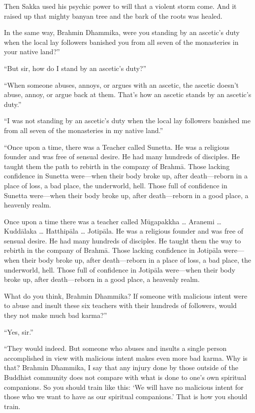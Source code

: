 \documentclass[12pt,openany]{book}%
\begin{document}
Then Sakka used his psychic power to will that a violent storm come. And it raised up that mighty banyan tree and the bark of the roots was healed. 

In the same way, Brahmin Dhammika, were you standing by an ascetic’s duty when the local lay followers banished you from all seven of the monasteries in your native land?” 

“But sir, how do I stand by an ascetic’s duty?” 

“When someone abuses, annoys, or argues with an ascetic, the ascetic doesn’t abuse, annoy, or argue back at them. That’s how an ascetic stands by an ascetic’s duty.” 

“I was not standing by an ascetic’s duty when the local lay followers banished me from all seven of the monasteries in my native land.” 

“Once upon a time, there was a Teacher called Sunetta. He was a religious founder and was free of sensual desire. He had many hundreds of disciples. He taught them the path to rebirth in the company of \textsanskrit{Brahmā}. Those lacking confidence in Sunetta were—when their body broke up, after death—reborn in a place of loss, a bad place, the underworld, hell. Those full of confidence in Sunetta were—when their body broke up, after death—reborn in a good place, a heavenly realm. 

Once upon a time there was a teacher called \textsanskrit{Mūgapakkha} … Aranemi … \textsanskrit{Kuddālaka} … \textsanskrit{Hatthipāla} … \textsanskrit{Jotipāla}. He was a religious founder and was free of sensual desire. He had many hundreds of disciples. He taught them the way to rebirth in the company of \textsanskrit{Brahmā}. Those lacking confidence in \textsanskrit{Jotipāla} were—when their body broke up, after death—reborn in a place of loss, a bad place, the underworld, hell. Those full of confidence in \textsanskrit{Jotipāla} were—when their body broke up, after death—reborn in a good place, a heavenly realm. 

What do you think, Brahmin Dhammika? If someone with malicious intent were to abuse and insult these six teachers with their hundreds of followers, would they not make much bad karma?” 

“Yes, sir.” 

“They would indeed. But someone who abuses and insults a single person accomplished in view with malicious intent makes even more bad karma. Why is that? Brahmin Dhammika, I say that any injury done by those outside of the Buddhist community does not compare with what is done to one’s own spiritual companions. So you should train like this: ‘We will have no malicious intent for those who we want to have as our spiritual companions.’ That is how you should train. 
\end{document}

